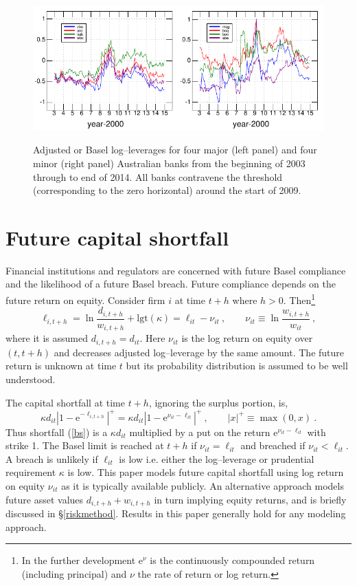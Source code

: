 \documentclass[authoryear]{elsarticle}
\newcommand{\logit}{\mathrm{lgt}}
\newcommand{\e}{\mathrm{e}}
\newcommand{\eref}[1]{(\ref{#1})}
\newcommand{\sref}[1]{\S\ref{#1}}
\newcommand{\cq}{\ , \qquad}
\newcommand{\be}[1]{\begin{equation}\label{#1}}
\newcommand{\ee}{\end{equation}}
\begin{document}
\begin{figure}[htbp]
\begin{center}
\label{Bloglev}
\includegraphics{figures/bloglev.pdf}
\caption{Adjusted or Basel log--leverages for four major (left panel) and four minor (right panel) Australian banks from the beginning of 2003 through to end of 2014.  All banks contravene the threshold (corresponding to the zero horizontal) around the start of 2009.}
\end{center}
\end{figure}


\section{Future capital shortfall}\label{futshort}

Financial institutions and regulators are concerned with future Basel compliance and the likelihood of a  future Basel breach.   Future compliance depends on the future return on equity.   Consider  firm $i$ at time  $t+h$ where $h>0$.  Then\footnote{In the further development $\e^\nu$ is the continuously compounded return (including principal) and $\nu$  the  rate of return or log return.}
$$
\ell_{i,t+h} = \ln \frac{d_{i,t+h}}{w_{i,t+h}} +\logit(\kappa)= \ell_{it} -\nu_{it}\cq \nu_{it}\equiv \ln\frac{w_{i,t+h}}{w_{it}}  \ ,
$$
where it is assumed $d_{i,t+h}=d_{it}$.  Here $\nu_{it}$ is the log return on equity over $(t,t+h)$ and decreases adjusted log--leverage by the same amount.  The future return is unknown at time $t$ but its probability distribution is assumed to be well understood.

The capital  shortfall  at time $t+h$, ignoring the surplus portion, is,
\be{bs}
\kappa d_{it} \left|1-\e^{-\ell_{i,t+h}}\right|^+=\kappa d_{it} \left|1-\e^{\nu_{it}-\ell_{it}}\right|^+
\cq  |x|^+\equiv \max(0,x)\ .
\ee
Thus shortfall \eref{bs} is a $\kappa d_{it}$ multiplied by a put on the return $\e^{\nu_{it}-\ell_{it}}$  with strike 1.
The Basel  limit is reached at $t+h$ if $\nu_{it}=\ell_{it}$ and  breached  if
$\nu_{it}< \ell_{it}$.
A breach is  unlikely if $\ell_{it}$ is low i.e. either the log--leverage or prudential requirement $\kappa$ is low. This paper models future capital shortfall using log return on equity $\nu_{it}$ as it is typically available publicly. An alternative approach models future asset values $d_{i,t+h}+w_{i,t+h}$ in turn implying equity returns, and is briefly discussed in \sref{riskmethod}. Results in this paper generally hold for any modeling approach.
\end{document}
